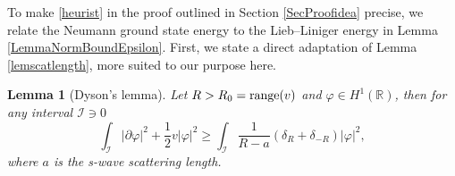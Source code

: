 \documentclass[a4paper,11pt]{article}
\newcommand{\abs}[1]{\left\lvert #1 \right\rvert}
\newcommand{\R}{\mathbb{R}}
\newtheorem{lemma}[theorem]{Lemma}
\numberwithin{equation}{section}
\begin{document}
	To make \eqref{heurist} in the proof outlined in Section \ref{SecProofidea} precise, we relate the Neumann ground state energy to the Lieb--Liniger energy in Lemma \ref{LemmaNormBoundEpsilon}. First, we state a direct adaptation of Lemma \ref{lemscatlength}, more suited to our purpose here. 
	
	\begin{lemma}[Dyson's lemma]\label{LemmaDyson} Let $ R>R_0=\textnormal{range}(v) $ and $ \varphi\in H^1(\R) $, then for any interval $ \mathcal{I}\ni 0 $ 
		\begin{equation}
		\int_{\mathcal{I}} \abs{\partial \varphi}^2+\frac12 v\abs{\varphi}^2\geq \int_{\mathcal{I}}\frac{1}{R-a}\left(\delta_R+\delta_{-R}\right)\abs{\varphi}^2,
		\end{equation}
		where $ a $ is the s-wave scattering length.
	\end{lemma}
	
	
	
\end{document}
